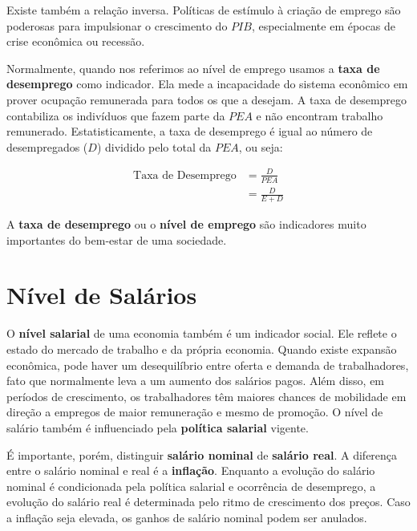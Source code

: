 \documentclass{article}\usepackage[]{graphicx}\usepackage[]{xcolor}
\begin{document}
Existe também a relação inversa. Políticas de estímulo à criação de emprego são poderosas para impulsionar o
crescimento do \(PIB\), especialmente em épocas de crise econômica ou recessão.\par

Normalmente, quando nos referimos ao nível de emprego usamos a \textbf{taxa de desemprego} como indicador.
Ela mede a incapacidade do sistema econômico em prover ocupação remunerada para todos os que a desejam.
A taxa de desemprego contabiliza os indivíduos que fazem parte da \(PEA\) e não encontram trabalho remunerado.
Estatisticamente, a taxa de desemprego é igual ao número de desempregados (\(D\)) dividido pelo total da \(PEA\), ou seja:


\begin{equation}\label{eq8}
\begin{split}
\text{Taxa de Desemprego} &= \frac{D}{PEA}\\
                          &= \frac{D}{E + D}
\end{split}
\end{equation}

A \textbf{taxa de desemprego} ou o \textbf{nível de emprego} são indicadores muito importantes do bem-estar de uma sociedade.

\section*{Nível de Salários}

O \textbf{nível salarial} de uma economia também é um indicador social. Ele reflete o estado do mercado de trabalho
e da própria economia. Quando existe expansão econômica, pode haver um desequilíbrio entre oferta e demanda
de trabalhadores, fato que normalmente leva a um aumento dos salários pagos. Além disso, em períodos de
crescimento, os trabalhadores têm maiores chances de mobilidade em direção a empregos de maior remuneração
e mesmo de promoção. O nível de salário também é influenciado pela \textbf{política salarial} vigente.\par

É importante, porém, distinguir \textbf{salário nominal} de \textbf{salário real}.
A diferença entre o salário nominal e real é a \textbf{inflação}. Enquanto a evolução do salário nominal é condicionada
pela política salarial e ocorrência de desemprego, a evolução do salário real é determinada pelo ritmo de
crescimento dos preços. Caso a inflação seja elevada, os ganhos de salário nominal podem ser anulados.\par
\end{document}
